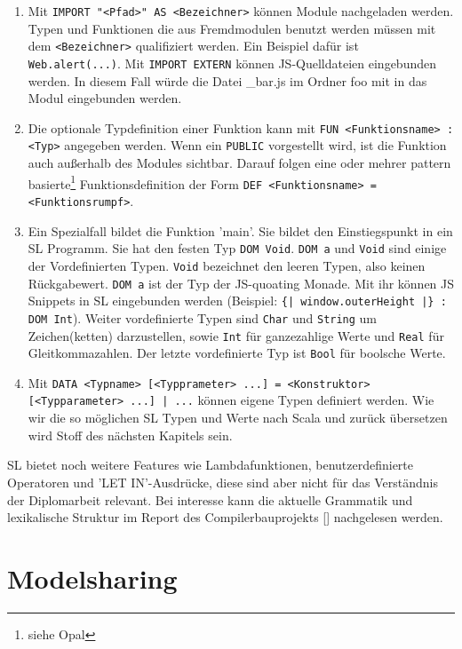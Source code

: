\documentclass[12pt]{scrreprt}
\begin{document}
\begin{enumerate}
  \item Mit \lstinline!IMPORT "<Pfad>" AS <Bezeichner>! können Module nachgeladen werden. Typen und Funktionen die aus Fremdmodulen benutzt werden müssen mit dem \lstinline!<Bezeichner>! qualifiziert werden. Ein Beispiel dafür ist \lstinline!Web.alert(...)!. Mit \lstinline!IMPORT EXTERN! können \ac{JS}-Quelldateien eingebunden werden. In diesem Fall würde die Datei \_bar.js im Ordner foo mit in das Modul eingebunden werden.
  \item Die optionale Typdefinition einer Funktion kann mit \lstinline!FUN <Funktionsname> : <Typ>! angegeben werden. Wenn ein \lstinline!PUBLIC! vorgestellt wird, ist die Funktion auch außerhalb des Modules sichtbar. Darauf folgen eine oder mehrer pattern basierte\footnote{siehe Opal} Funktionsdefinition der Form \lstinline!DEF <Funktionsname> = <Funktionsrumpf>!.
  \item Ein Spezialfall bildet die Funktion 'main'. Sie bildet den Einstiegspunkt in ein \ac{SL} Programm. Sie hat den festen Typ \lstinline!DOM Void!. \lstinline!DOM a! und \lstinline!Void! sind einige der Vordefinierten Typen. \lstinline!Void! bezeichnet den leeren Typen, also keinen Rückgabewert. \lstinline!DOM a! ist der Typ der \ac{JS}-quoating Monade. Mit ihr können \ac{JS} Snippets in \ac{SL} eingebunden werden (Beispiel: \lstinline!{| window.outerHeight |} : DOM Int!). Weiter vordefinierte Typen sind \lstinline!Char! und \lstinline!String! um Zeichen(ketten) darzustellen, sowie \lstinline!Int! für ganzezahlige Werte und \lstinline!Real! für Gleitkommazahlen. Der letzte vordefinierte Typ ist \lstinline!Bool! für boolsche Werte.
  \item Mit \lstinline!DATA <Typname> [<Typprameter> ...] = <Konstruktor> [<Typparameter> ...] | ...! können eigene Typen definiert werden. Wie wir die so möglichen \ac{SL} Typen und Werte nach Scala und zurück übersetzen wird Stoff des nächsten Kapitels sein.
\end{enumerate}

\ac{SL} bietet noch weitere Features wie Lambdafunktionen, benutzerdefinierte Operatoren und 'LET IN'-Ausdrücke, diese sind aber nicht für das Verständnis der Diplomarbeit relevant. Bei interesse kann die aktuelle Grammatik und lexikalische Struktur im Report des Compilerbauprojekts [] nachgelesen werden.

\chapter{Modelsharing}
\end{document}
